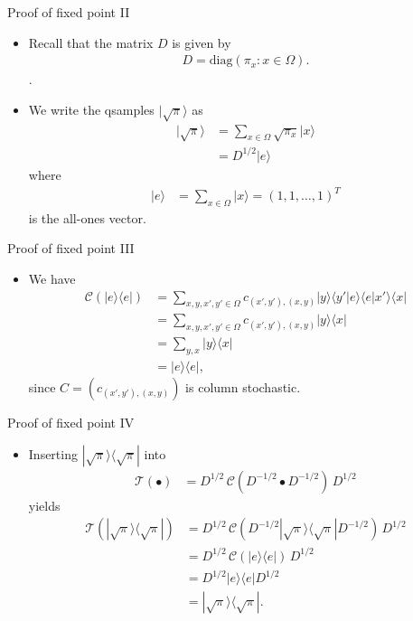 \documentclass{beamer}
\renewcommand{\>}{\rangle}
\newcommand{\<}{\langle}
\newcommand{\cC}{\mathcal{C}}
\newcommand{\cT}{\mathcal{T}}
\begin{document}

\begin{frame}{Proof of fixed point II}
\begin{itemize}
    \item Recall that the matrix $D$ is given by
    \begin{align*}
        D=\mathrm{diag}(\pi_x : x \in \Omega).
    \end{align*}.

    \item We write the qsamples $|\sqrt{\pi}\>$ as
    \begin{align*}
    |\sqrt{\pi}\>
    &=
    \sum_{x \in \Omega} \sqrt{\pi_x} |x\> \\
    &=
    D^{1/2}|e\>
    \end{align*}
    where 
    \begin{align*}
        |e\>
        &=
        \sum_{x\in\Omega}|x\> =
        (1,1,\ldots,1)^T
    \end{align*} 
    is the all-ones vector.
\end{itemize}
\end{frame}


\begin{frame}{Proof of fixed point III}
    
\begin{itemize}
    \item We have 
    \begin{align*}
        \cC(|e\>\<e|)
        &=
        \sum_{x,y,x',y'\in\Omega} c_{(x',y'),(x,y)} |y\>\<y'|e\>\<e|x'\>\<x| \\
        &=
        \sum_{x,y,x',y'\in\Omega} c_{(x',y'),(x,y)} |y\>\<x| \\
        &=
        \sum_{y,x} |y\>\<x| \\
        &= |e\>\<e|,
    \end{align*}
    since $C=(c_{(x',y'),(x,y)})$ is column stochastic.
    \end{itemize}
\end{frame}


\begin{frame}{Proof of fixed point IV}
\begin{itemize}
    \item Inserting $|\sqrt{\pi}\>\<\sqrt{\pi}|$ into
    \begin{align*}
        \cT(\bullet) 
        &=
        D^{1/2} \, \cC( D^{-1/2} \bullet D^{-1/2}) \, D^{1/2}
    \end{align*}
    yields 
    \begin{align*}
        \cT(|\sqrt{\pi}\>\<\sqrt{\pi}|)
        &=
        D^{1/2} \, \cC( D^{-1/2} |\sqrt{\pi}\>\<\sqrt{\pi}| D^{-1/2} ) \, D^{1/2} \\
        &=
        D^{1/2} \, \cC(|e\>\<e|) \, D^{1/2} \\
        &=
        D^{1/2} |e\>\<e| D^{1/2} \\
        &= 
        |\sqrt{\pi}\>\<\sqrt{\pi}|.
    \end{align*}
\end{itemize}
\end{frame}
\end{document}
